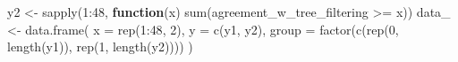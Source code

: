 \documentclass[
  11pt,
  oneside]{book}
\newenvironment{Shaded}{\begin{snugshade}}{\end{snugshade}}
\newcommand{\AttributeTok}[1]{\textcolor[rgb]{0.77,0.63,0.00}{#1}}
\newcommand{\ControlFlowTok}[1]{\textcolor[rgb]{0.13,0.29,0.53}{\textbf{#1}}}
\newcommand{\DecValTok}[1]{\textcolor[rgb]{0.00,0.00,0.81}{#1}}
\newcommand{\FunctionTok}[1]{\textcolor[rgb]{0.00,0.00,0.00}{#1}}
\newcommand{\NormalTok}[1]{#1}
\newcommand{\OtherTok}[1]{\textcolor[rgb]{0.56,0.35,0.01}{#1}}
\newcommand{\SpecialCharTok}[1]{\textcolor[rgb]{0.00,0.00,0.00}{#1}}
\begin{document}
\begin{Shaded}
\begin{Highlighting}[]
\NormalTok{y2 }\OtherTok{\textless{}{-}} \FunctionTok{sapply}\NormalTok{(}\DecValTok{1}\SpecialCharTok{:}\DecValTok{48}\NormalTok{, }\ControlFlowTok{function}\NormalTok{(x) }\FunctionTok{sum}\NormalTok{(agreement\_w\_tree\_filtering }\SpecialCharTok{\textgreater{}=}\NormalTok{ x))}
\NormalTok{data\_ }\OtherTok{\textless{}{-}} \FunctionTok{data.frame}\NormalTok{(}
  \AttributeTok{x =} \FunctionTok{rep}\NormalTok{(}\DecValTok{1}\SpecialCharTok{:}\DecValTok{48}\NormalTok{, }\DecValTok{2}\NormalTok{), }\AttributeTok{y =} \FunctionTok{c}\NormalTok{(y1, y2),}
  \AttributeTok{group =} \FunctionTok{factor}\NormalTok{(}\FunctionTok{c}\NormalTok{(}\FunctionTok{rep}\NormalTok{(}\DecValTok{0}\NormalTok{, }\FunctionTok{length}\NormalTok{(y1)), }\FunctionTok{rep}\NormalTok{(}\DecValTok{1}\NormalTok{, }\FunctionTok{length}\NormalTok{(y2))))}
\NormalTok{)}


\end{Highlighting}
\end{Shaded}
\end{document}
